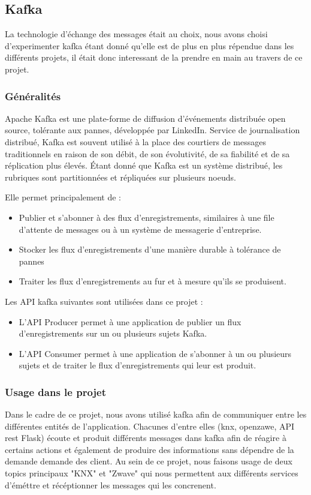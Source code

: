 \subsection{Kafka}
La technologie d'échange des messages était au choix, nous avons choisi d'experimenter kafka étant donné qu'elle est de plus en plus répendue dans les différents projets, il était donc interessant de la prendre en main au travers de ce projet.
\subsubsection{Généralités}
Apache Kafka est une plate-forme de diffusion d'événements distribuée open source, tolérante aux pannes, développée par LinkedIn. Service de journalisation distribué, Kafka est souvent utilisé à la place des courtiers de messages traditionnels en raison de son débit, de son évolutivité, de sa fiabilité et de sa réplication plus élevés. Étant donné que Kafka est un système distribué, les rubriques sont partitionnées et répliquées sur plusieurs noeuds.

Elle permet principalement de :
\begin{itemize}
    \item Publier et s'abonner à des flux d'enregistrements, similaires à une file d'attente de messages ou à un système de messagerie d'entreprise.
    \item Stocker les flux d'enregistrements d'une manière durable à tolérance de pannes
    \item Traiter les flux d'enregistrements au fur et à mesure qu'ils se produisent.
\end{itemize}

Les API kafka suivantes sont utilisées dans ce projet :
\begin{itemize}
    \item L'API Producer permet à une application de publier un flux d'enregistrements sur un ou plusieurs sujets Kafka.
    \item L'API Consumer permet à une application de s'abonner à un ou plusieurs sujets et de traiter le flux d'enregistrements qui leur est produit.
\end{itemize}

\subsubsection{Usage dans le projet}
Dans le cadre de ce projet, nous avons utilisé kafka afin de communiquer entre les différentes entités de l'application.
Chacunes d'entre elles (knx, openzawe, API rest Flask) écoute et produit différents messages dans kafka afin de réagire à certains actions et également de produire des informations sans dépendre de la demande demande des client. Au sein de ce projet, nous faisons usage de deux topics principaux "KNX" et "Zwave" qui nous permettent aux différents services d'éméttre et récéptionner les messages qui les concrenent.
